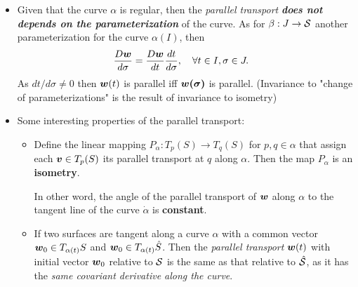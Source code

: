 \documentclass[11pt]{article}
\begin{document}
\begin{itemize}
\item Given that the curve $\alpha$ is regular, then the \emph{parallel transport} \textbf{\emph{does not depends on the parameterization}} of the curve. As for $\beta: J \rightarrow {\mathcal S}$ another parameterization for the curve $\alpha(I)$, then 
\begin{align*}
\frac{D\boldsymbol{w}}{d\sigma} &= \frac{D\boldsymbol{w}}{dt}\frac{dt}{d\sigma}, \quad \forall t\in I, \sigma\in J.
\end{align*}
As $dt/d\sigma\neq 0$ then $\boldsymbol{w}(t)$ is parallel iff $\boldsymbol{w(\sigma)}$ is parallel. (Invariance to "change of parameterizations" is the result of invariance to isometry)

\item Some interesting properties of the parallel transport:
\begin{itemize}
\item \begin{proposition}
Define the linear mapping $P_{\alpha}: T_{p}(S) \rightarrow T_{q}(S)$ for $p,q\in \alpha$ that assign each $\boldsymbol{v}\in  T_{p}(S)$ its parallel transport at $q$ along $\alpha$. Then the map $P_{\alpha}$ is an \textbf{isometry}. 
\end{proposition}

In other word, the angle of the parallel transport of $\boldsymbol{w}$ along $\alpha$ to the tangent line of the curve $\dot{\alpha}$ is \textbf{constant}. 

\item If two surfaces are tangent along a curve $\alpha$ with a common vector $\boldsymbol{w}_{0} \in T_{\alpha(t)}S$ and $\boldsymbol{w}_{0} \in T_{\alpha(t)}\hat{S}$. Then the \emph{parallel transport} $\boldsymbol{w}(t)$ with initial vector $\boldsymbol{w}_{0}$ relative to ${\mathcal S}$ is the same as that relative to $\hat{{\mathcal S}}$, as it has the \emph{same covariant derivative along the curve}.
\end{itemize}


\end{itemize}
\end{document}
